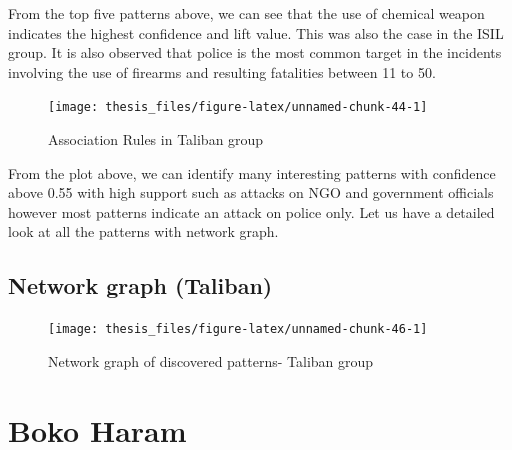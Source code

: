 \documentclass[11pt,oneside,a4paper]{reedthesis}
\begin{document}
From the top five patterns above, we can see that the use of chemical
weapon indicates the highest confidence and lift value. This was also
the case in the ISIL group. It is also observed that police is the most
common target in the incidents involving the use of firearms and
resulting fatalities between 11 to 50.
\begin{figure}
\texttt{[image: thesis\_files/figure-latex/unnamed-chunk-44-1]} \caption{Association Rules in Taliban group}\label{fig:unnamed-chunk-44}
\end{figure}
From the plot above, we can identify many interesting patterns with
confidence above 0.55 with high support such as attacks on NGO and
government officials however most patterns indicate an attack on police
only. Let us have a detailed look at all the patterns with network
graph.

\subsection{Network graph (Taliban)}\label{network-graph-taliban}
\begin{figure}
\texttt{[image: thesis\_files/figure-latex/unnamed-chunk-46-1]} \caption{Network graph of discovered patterns- Taliban group}\label{fig:unnamed-chunk-46}
\end{figure}
\section{Boko Haram}\label{boko-haram}
\end{document}
